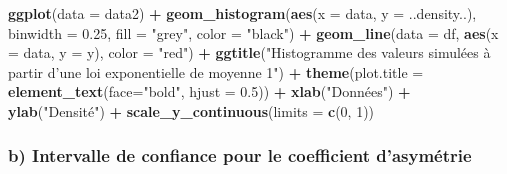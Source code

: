 \documentclass[]{article}
\newenvironment{Shaded}{\begin{snugshade}}{\end{snugshade}}
\newcommand{\KeywordTok}[1]{\textcolor[rgb]{0.13,0.29,0.53}{\textbf{#1}}}
\newcommand{\DataTypeTok}[1]{\textcolor[rgb]{0.13,0.29,0.53}{#1}}
\newcommand{\DecValTok}[1]{\textcolor[rgb]{0.00,0.00,0.81}{#1}}
\newcommand{\FloatTok}[1]{\textcolor[rgb]{0.00,0.00,0.81}{#1}}
\newcommand{\StringTok}[1]{\textcolor[rgb]{0.31,0.60,0.02}{#1}}
\newcommand{\OperatorTok}[1]{\textcolor[rgb]{0.81,0.36,0.00}{\textbf{#1}}}
\newcommand{\NormalTok}[1]{#1}
\begin{document}
\begin{Shaded}
\begin{Highlighting}[]
\KeywordTok{ggplot}\NormalTok{(}\DataTypeTok{data =}\NormalTok{ data2) }\OperatorTok{+}
\StringTok{        }\KeywordTok{geom_histogram}\NormalTok{(}\KeywordTok{aes}\NormalTok{(}\DataTypeTok{x =}\NormalTok{ data, }\DataTypeTok{y =}\NormalTok{ ..density..),}
                   \DataTypeTok{binwidth =} \FloatTok{0.25}\NormalTok{, }\DataTypeTok{fill =} \StringTok{"grey"}\NormalTok{, }\DataTypeTok{color =} \StringTok{"black"}\NormalTok{) }\OperatorTok{+}
\StringTok{        }\KeywordTok{geom_line}\NormalTok{(}\DataTypeTok{data =}\NormalTok{ df, }\KeywordTok{aes}\NormalTok{(}\DataTypeTok{x =}\NormalTok{ data, }\DataTypeTok{y =}\NormalTok{ y), }\DataTypeTok{color =} \StringTok{"red"}\NormalTok{) }\OperatorTok{+}
\StringTok{        }\KeywordTok{ggtitle}\NormalTok{(}\StringTok{"Histogramme des valeurs simulées à partir }
\StringTok{                    d'une loi exponentielle de moyenne 1"}\NormalTok{) }\OperatorTok{+}\StringTok{ }
\StringTok{        }\KeywordTok{theme}\NormalTok{(}\DataTypeTok{plot.title =}  \KeywordTok{element_text}\NormalTok{(}\DataTypeTok{face=}\StringTok{"bold"}\NormalTok{, }\DataTypeTok{hjust =} \FloatTok{0.5}\NormalTok{)) }\OperatorTok{+}
\StringTok{        }\KeywordTok{xlab}\NormalTok{(}\StringTok{"Données"}\NormalTok{) }\OperatorTok{+}
\StringTok{        }\KeywordTok{ylab}\NormalTok{(}\StringTok{"Densité"}\NormalTok{) }\OperatorTok{+}
\StringTok{        }\KeywordTok{scale_y_continuous}\NormalTok{(}\DataTypeTok{limits =} \KeywordTok{c}\NormalTok{(}\DecValTok{0}\NormalTok{, }\DecValTok{1}\NormalTok{))}
\end{Highlighting}
\end{Shaded}

\subsubsection{b) Intervalle de confiance pour le coefficient
d'asymétrie}\label{b-intervalle-de-confiance-pour-le-coefficient-dasymetrie-1}
\end{document}
